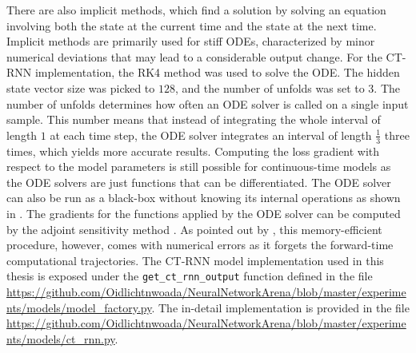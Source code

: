 \documentclass[draft,final]{vutinfth} %
\begin{document}
    There are also implicit methods, which find a solution by solving an equation involving both the state at the current time and the state at the next time.
    Implicit methods are primarily used for stiff ODEs, characterized by minor numerical deviations that may lead to a considerable output change.
    For the CT-RNN implementation, the RK4 method was used to solve the ODE. The hidden state vector size was picked to $128$, and the number of unfolds was set to $3$.
    The number of unfolds determines how often an ODE solver is called on a single input sample. This number means that instead of integrating the whole interval of length $1$ at each time step, the ODE solver integrates an interval of length $\frac{1}{3}$ three times, which yields more accurate results.
    Computing the loss gradient with respect to the model parameters is still possible for continuous-time models as the ODE solvers are just functions that can be differentiated.
    The ODE solver can also be run as a black-box without knowing its internal operations as shown in \cite{NeuralODEs}.
    The gradients for the functions applied by the ODE solver can be computed by the adjoint sensitivity method \cite{AdjointSensitivityMethod}.
    As pointed out by \cite[p. 3]{LTCNetworks}, this memory-efficient procedure, however, comes with numerical errors as it forgets the forward-time computational trajectories.
    The CT-RNN model implementation used in this thesis is exposed under the \texttt{get\_ct\_rnn\_output} function defined in the file \url{https://github.com/Oidlichtnwoada/NeuralNetworkArena/blob/master/experiments/models/model_factory.py}.
    The in-detail implementation is provided in the file \url{https://github.com/Oidlichtnwoada/NeuralNetworkArena/blob/master/experiments/models/ct_rnn.py}.
\end{document}
